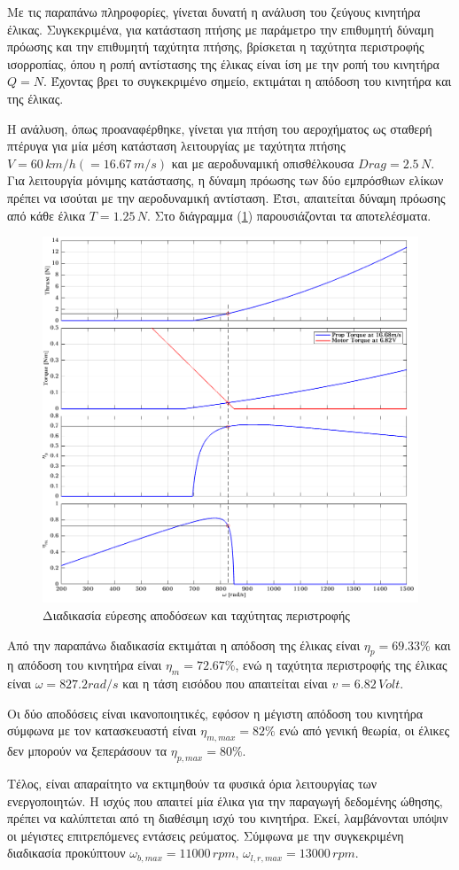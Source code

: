 Με τις παραπάνω πληροφορίες, γίνεται δυνατή η ανάλυση του ζεύγους κινητήρα
έλικας. Συγκεκριμένα, για κατάσταση πτήσης με παράμετρο την επιθυμητή δύναμη
πρόωσης και την επιθυμητή ταχύτητα πτήσης, βρίσκεται η ταχύτητα περιστροφής 
ισορροπίας, όπου η ροπή αντίστασης της έλικας είναι ίση με την ροπή του κινητήρα
\(Q = N\). Έχοντας βρει το συγκεκριμένο σημείο, εκτιμάται η απόδοση του κινητήρα
και της έλικας.

Η ανάλυση, όπως προαναφέρθηκε, γίνεται για πτήση του αεροχήματος ως σταθερή
πτέρυγα για μία μέση κατάσταση λειτουργίας με ταχύτητα πτήσης 
$V = 60\,km/h (= 16.67\,m/s)$ και με αεροδυναμική οπισθέλκουσα $Drag = 2.5\,N$. 
Για λειτουργία μόνιμης κατάστασης, η δύναμη πρόωσης των δύο εμπρόσθιων ελίκων 
πρέπει να ισούται με την αεροδυναμική αντίσταση. Έτσι, απαιτείται δύναμη πρόωσης 
από κάθε έλικα $T = 1.25\,N$. Στο διάγραμμα (\ref{fig_untl}) παρουσιάζονται τα 
αποτελέσματα.
\begin{figure}[H]
    \centering
    \includegraphics[scale=0.6]{Motor/untitled.png}
    \caption{Διαδικασία εύρεσης αποδόσεων και ταχύτητας περιστροφής}
    \label{fig_untl}
\end{figure}

Από την παραπάνω διαδικασία εκτιμάται η απόδοση της έλικας είναι \(\eta_{p} = 
69.33\%\) και η απόδοση του κινητήρα είναι \(\eta_{m} = 72.67\%\), ενώ η 
ταχύτητα περιστροφής της έλικας είναι \(\omega = 827.2rad/s\) και η τάση εισόδου
που απαιτείται είναι \(v = 6.82\,Volt\).

Οι δύο αποδόσεις είναι ικανοποιητικές, εφόσον η μέγιστη απόδοση του κινητήρα 
σύμφωνα με τον κατασκευαστή είναι \(\eta_{m,max} = 82\%\) ενώ από γενική θεωρία,
οι έλικες δεν μπορούν να ξεπεράσουν τα \(\eta_{p,max} = 80\%\).

Τέλος, είναι απαραίτητο να εκτιμηθούν τα φυσικά όρια λειτουργίας των 
ενεργοποιητών. Η ισχύς που απαιτεί μία έλικα για την παραγωγή δεδομένης ώθησης, 
πρέπει να καλύπτεται από τη διαθέσιμη ισχύ του κινητήρα. Εκεί, λαμβάνονται 
υπόψιν οι μέγιστες επιτρεπόμενες εντάσεις ρεύματος. Σύμφωνα με την συγκεκριμένη
διαδικασία προκύπτουν $\omega_{b,max} = 11000\,rpm$, $\omega_{l,r,max} = 13000\,
rpm$.